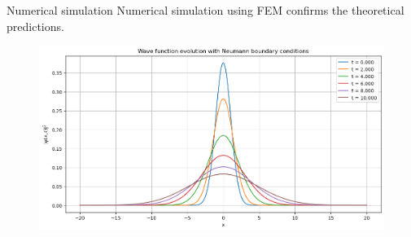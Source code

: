 \begin{frame}{Numerical simulation}
    Numerical simulation using FEM confirms the theoretical predictions.

    \begin{figure}[H]
        \centering
        \includegraphics[width=\textwidth]{Immagini/plot-schrodinger-free-particle.png}
    \end{figure}
\end{frame}

